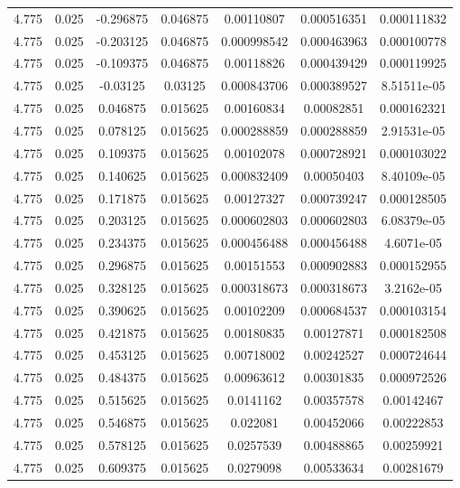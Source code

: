 \begin{table}[bh]
\begin{center}
{\begin{tabular}{ccccccc}
4.775	 & 0.025 & 	-0.296875	 & 0.046875	 & 0.00110807	 & 0.000516351	 & 0.000111832 \\ 
4.775	 & 0.025 & 	-0.203125	 & 0.046875	 & 0.000998542	 & 0.000463963	 & 0.000100778 \\ 
4.775	 & 0.025 & 	-0.109375	 & 0.046875	 & 0.00118826	 & 0.000439429	 & 0.000119925 \\ 
4.775	 & 0.025 & 	-0.03125	 & 0.03125	 & 0.000843706	 & 0.000389527	 & 8.51511e-05 \\ 
4.775	 & 0.025 & 	0.046875	 & 0.015625	 & 0.00160834	 & 0.00082851	 & 0.000162321 \\ 
4.775	 & 0.025 & 	0.078125	 & 0.015625	 & 0.000288859	 & 0.000288859	 & 2.91531e-05 \\ 
4.775	 & 0.025 & 	0.109375	 & 0.015625	 & 0.00102078	 & 0.000728921	 & 0.000103022 \\ 
4.775	 & 0.025 & 	0.140625	 & 0.015625	 & 0.000832409	 & 0.00050403	 & 8.40109e-05 \\ 
4.775	 & 0.025 & 	0.171875	 & 0.015625	 & 0.00127327	 & 0.000739247	 & 0.000128505 \\ 
4.775	 & 0.025 & 	0.203125	 & 0.015625	 & 0.000602803	 & 0.000602803	 & 6.08379e-05 \\ 
4.775	 & 0.025 & 	0.234375	 & 0.015625	 & 0.000456488	 & 0.000456488	 & 4.6071e-05 \\ 
4.775	 & 0.025 & 	0.296875	 & 0.015625	 & 0.00151553	 & 0.000902883	 & 0.000152955 \\ 
4.775	 & 0.025 & 	0.328125	 & 0.015625	 & 0.000318673	 & 0.000318673	 & 3.2162e-05 \\ 
4.775	 & 0.025 & 	0.390625	 & 0.015625	 & 0.00102209	 & 0.000684537	 & 0.000103154 \\ 
4.775	 & 0.025 & 	0.421875	 & 0.015625	 & 0.00180835	 & 0.00127871	 & 0.000182508 \\ 
4.775	 & 0.025 & 	0.453125	 & 0.015625	 & 0.00718002	 & 0.00242527	 & 0.000724644 \\ 
4.775	 & 0.025 & 	0.484375	 & 0.015625	 & 0.00963612	 & 0.00301835	 & 0.000972526 \\ 
4.775	 & 0.025 & 	0.515625	 & 0.015625	 & 0.0141162	 & 0.00357578	 & 0.00142467 \\ 
4.775	 & 0.025 & 	0.546875	 & 0.015625	 & 0.022081	 & 0.00452066	 & 0.00222853 \\ 
4.775	 & 0.025 & 	0.578125	 & 0.015625	 & 0.0257539	 & 0.00488865	 & 0.00259921 \\ 
4.775	 & 0.025 & 	0.609375	 & 0.015625	 & 0.0279098	 & 0.00533634	 & 0.00281679 \\ 

\end{tabular}}
\end{center}
\end{table}
